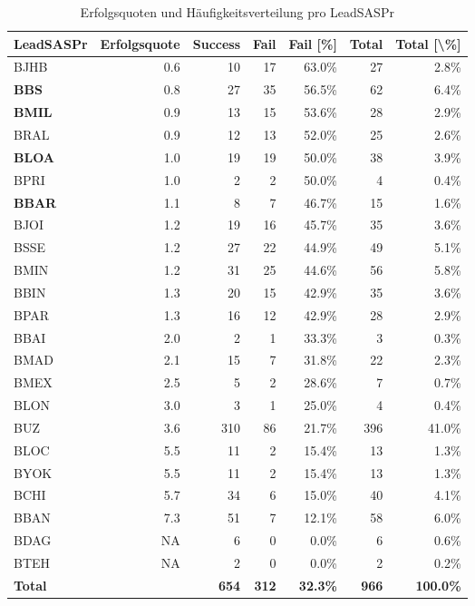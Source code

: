 \begin{table}[H]
	\centering
	\caption{Erfolgsquoten und Häufigkeitsverteilung pro LeadSASPr}
	\begin{tabular}{lrrrrrr}
		\textbf{LeadSASPr} & \multicolumn{1}{l}{\textbf{Erfolgsquote}} & \multicolumn{1}{l}{\textbf{Success}} & \multicolumn{1}{l}{\textbf{Fail}} & \multicolumn{1}{l}{\textbf{Fail [\%]}} & \multicolumn{1}{l}{\textbf{Total}} & \multicolumn{1}{l}{\textbf{Total [\textbackslash{}\%]}} \\\hline
		BJHB  & 0.6   & 10    & 17    & 63.0\% & 27    & 2.8\% \\
		\textbf{BBS}   & 0.8   & 27    & 35    & 56.5\% & 62    & 6.4\% \\
		\textbf{BMIL}  & 0.9   & 13    & 15    & 53.6\% & 28    & 2.9\% \\
		BRAL  & 0.9   & 12    & 13    & 52.0\% & 25    & 2.6\% \\
		\textbf{BLOA}  & 1.0   & 19    & 19    & 50.0\% & 38    & 3.9\% \\
		BPRI  & 1.0   & 2     & 2     & 50.0\% & 4     & 0.4\% \\
		\textbf{BBAR}  & 1.1   & 8     & 7     & 46.7\% & 15    & 1.6\% \\
		BJOI  & 1.2   & 19    & 16    & 45.7\% & 35    & 3.6\% \\
		BSSE  & 1.2   & 27    & 22    & 44.9\% & 49    & 5.1\% \\
		BMIN  & 1.2   & 31    & 25    & 44.6\% & 56    & 5.8\% \\
		BBIN  & 1.3   & 20    & 15    & 42.9\% & 35    & 3.6\% \\
		BPAR  & 1.3   & 16    & 12    & 42.9\% & 28    & 2.9\% \\
		BBAI  & 2.0   & 2     & 1     & 33.3\% & 3     & 0.3\% \\
		BMAD  & 2.1   & 15    & 7     & 31.8\% & 22    & 2.3\% \\
		BMEX  & 2.5   & 5     & 2     & 28.6\% & 7     & 0.7\% \\
		BLON  & 3.0   & 3     & 1     & 25.0\% & 4     & 0.4\% \\
		BUZ   & 3.6   & 310   & 86    & 21.7\% & 396   & 41.0\% \\
		BLOC  & 5.5   & 11    & 2     & 15.4\% & 13    & 1.3\% \\
		BYOK  & 5.5   & 11    & 2     & 15.4\% & 13    & 1.3\% \\
		BCHI  & 5.7   & 34    & 6     & 15.0\% & 40    & 4.1\% \\
		BBAN  & 7.3   & 51    & 7     & 12.1\% & 58    & 6.0\% \\
		BDAG  & \multicolumn{1}{r}{NA} & 6     & 0     & 0.0\% & 6     & 0.6\% \\
		BTEH  & \multicolumn{1}{r}{NA} & 2     & 0     & 0.0\% & 2     & 0.2\% \\\hline
		\textbf{Total} &       & \textbf{654} & \textbf{312} & \textbf{32.3\%} & \textbf{966} & \textbf{100.0\%} \\
	\end{tabular}%
	\label{fleadsas}%
\end{table}%
